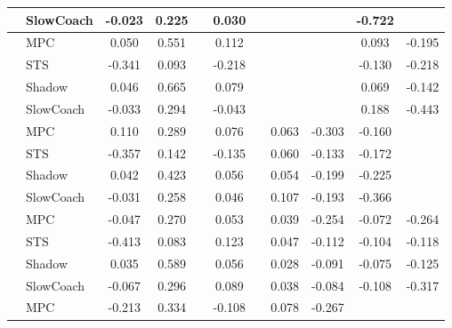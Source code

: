 \begin{tabular}{|l|l|*{9}{c|}}
                                                           & SlowCoach &   -0.023 &     0.225 &        &  0.030 &     &     &      &  -0.722 &       \\
\midrule
[True, True, False, True, False, False, False, True, True] & MPC &    0.050 &     0.551 &        &  0.112 &     &     &      &   0.093 &   -0.195 \\
                                                           & STS &   -0.341 &     0.093 &        & -0.218 &     &     &      &  -0.130 &   -0.218 \\
                                                           & Shadow &    0.046 &     0.665 &        &  0.079 &     &     &      &   0.069 &   -0.142 \\
                                                           & SlowCoach &   -0.033 &     0.294 &        & -0.043 &     &     &      &   0.188 &   -0.443 \\
\midrule
[True, True, False, True, False, True, True, True, False] & MPC &    0.110 &     0.289 &        &  0.076 &     &  0.063 &  -0.303 &  -0.160 &       \\
                                                           & STS &   -0.357 &     0.142 &        & -0.135 &     &  0.060 &  -0.133 &  -0.172 &       \\
                                                           & Shadow &    0.042 &     0.423 &        &  0.056 &     &  0.054 &  -0.199 &  -0.225 &       \\
                                                           & SlowCoach &   -0.031 &     0.258 &        &  0.046 &     &  0.107 &  -0.193 &  -0.366 &       \\
\midrule
[True, True, False, True, False, True, True, True, True] & MPC &   -0.047 &     0.270 &        &  0.053 &     &  0.039 &  -0.254 &  -0.072 &   -0.264 \\
                                                           & STS &   -0.413 &     0.083 &        &  0.123 &     &  0.047 &  -0.112 &  -0.104 &   -0.118 \\
                                                           & Shadow &    0.035 &     0.589 &        &  0.056 &     &  0.028 &  -0.091 &  -0.075 &   -0.125 \\
                                                           & SlowCoach &   -0.067 &     0.296 &        &  0.089 &     &  0.038 &  -0.084 &  -0.108 &   -0.317 \\
\midrule
[True, True, False, True, False, True, True, False, False] & MPC &   -0.213 &     0.334 &        & -0.108 &     &  0.078 &  -0.267 &      &       \\

\end{tabular}
